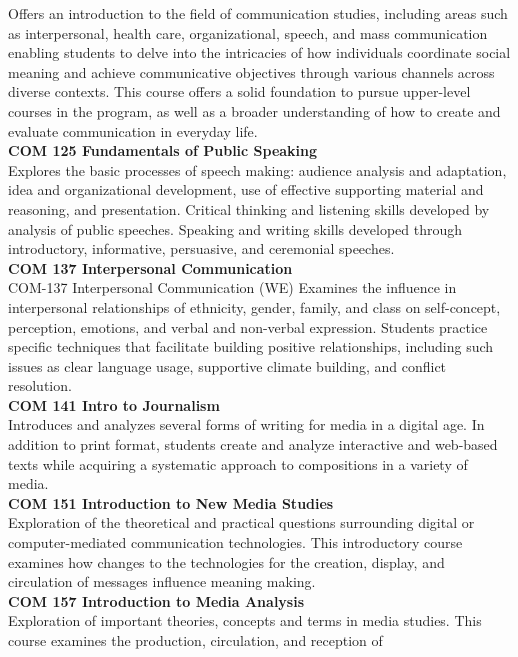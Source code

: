 \documentclass[
  letterpaper,
]{scrbook}
\begin{document}
Offers an introduction to the field of communication studies, including
areas such as interpersonal, health care, organizational, speech, and
mass communication enabling students to delve into the intricacies of
how individuals coordinate social meaning and achieve communicative
objectives through various channels across diverse contexts. This course
offers a solid foundation to pursue upper-level courses in the program,
as well as a broader understanding of how to create and evaluate
communication in everyday life.\\
\textbf{COM 125 Fundamentals of Public Speaking}\\
Explores the basic processes of speech making: audience analysis and
adaptation, idea and organizational development, use of effective
supporting material and reasoning, and presentation. Critical thinking
and listening skills developed by analysis of public speeches. Speaking
and writing skills developed through introductory, informative,
persuasive, and ceremonial speeches.\\
\textbf{COM 137 Interpersonal Communication}\\
COM-137 Interpersonal Communication (WE) Examines the influence in
interpersonal relationships of ethnicity, gender, family, and class on
self-concept, perception, emotions, and verbal and non-verbal
expression. Students practice specific techniques that facilitate
building positive relationships, including such issues as clear language
usage, supportive climate building, and conflict resolution.\\
\textbf{COM 141 Intro to Journalism}\\
Introduces and analyzes several forms of writing for media in a digital
age. In addition to print format, students create and analyze
interactive and web-based texts while acquiring a systematic approach to
compositions in a variety of media.\\
\textbf{COM 151 Introduction to New Media Studies}\\
Exploration of the theoretical and practical questions surrounding
digital or computer-mediated communication technologies. This
introductory course examines how changes to the technologies for the
creation, display, and circulation of messages influence meaning
making.\\
\textbf{COM 157 Introduction to Media Analysis}\\
Exploration of important theories, concepts and terms in media studies.
This course examines the production, circulation, and reception of
\end{document}
